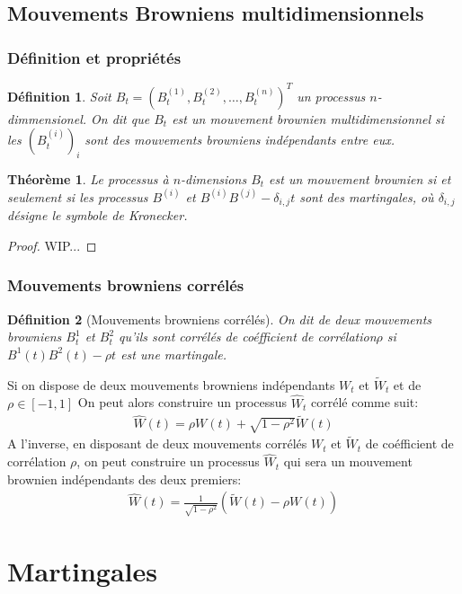 \documentclass[a4paper]{article}
\newtheorem{theorem}{Théorème}[section]
\newtheorem{definition}{Définition}
\newtheorem{proof}{Démonstration}
\begin{document}
\subsection{Mouvements Browniens multidimensionnels}

\subsubsection{Définition et propriétés}
\begin{definition}
Soit $B_t = (B_t^{(1)}, B_t^{(2)}, \dots, B_t^{(n)})^T$ un processus $n$-dimmensionel. On dit que $B_t$ est un mouvement brownien multidimensionnel si les $(B_t^{(i)})_i$ sont des mouvements browniens indépendants entre eux. 
\end{definition}
\begin{theorem}
    Le processus à $n$-dimensions $B_t$ est un mouvement brownien si et seulement si les processus $B^{(i)}$ et $B^{(i)}B^{(j)} - \delta_{i,j} t$ sont des martingales, où $\delta_{i,j}$ désigne le symbole de Kronecker.
\end{theorem}
\begin{proof}
    WIP...
\end{proof}
\subsubsection{Mouvements browniens corrélés}

\begin{definition}[Mouvements browniens corrélés]
On dit de deux mouvements browniens $B_t^1$ et $B_t^2$ qu'ils sont corrélés de coéfficient de corrélation$\rho$ si $B^1(t) B^2(t) - \rho t$ est une martingale.
\end{definition}
Si on dispose de deux mouvements browniens indépendants $W_t$ et $\tilde{W}_t$  et de $\rho \in [-1,1]$ On peut alors construire un processus $\hat{W}_t$ corrélé comme suit:
\begin{align*}
    \hat{W}(t) = \rho W(t) + \sqrt{1 - \rho^2}\tilde{W}(t)
\end{align*}
A l'inverse, en disposant de deux mouvements corrélés $W_t$ et $\tilde{W}_t$ de coéfficient de corrélation $\rho$, on peut construire un processus $\hat{W}_t$ qui sera un mouvement brownien indépendants des deux premiers:
\begin{align*}
    \hat{W}(t) = \frac{1}{\sqrt{1-\rho^2}}(\tilde{W}(t) - \rho W(t))
\end{align*}

\section{Martingales}
\end{document}
